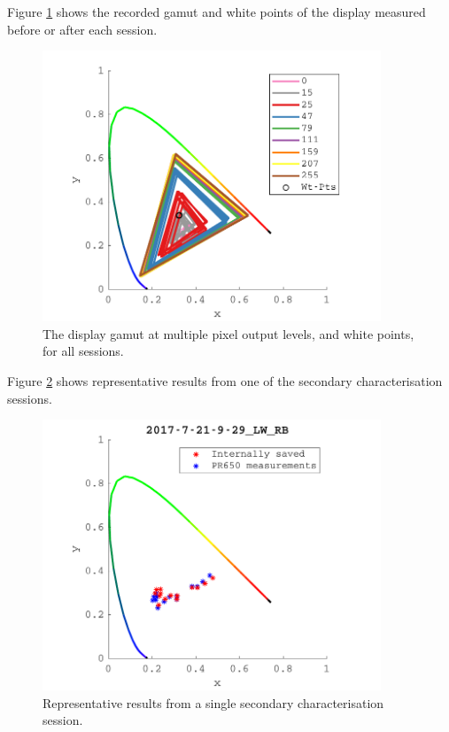 %
Figure \ref{fig:SSgamut} shows the recorded gamut and white points of the display measured before or after each session. 
%
\begin{figure}[htbp]
\includegraphics[max width=0.9\textwidth,center]{figs/SmallSphere/SSgamut.pdf}
\caption{The display gamut at multiple pixel output levels, and white points, for all sessions.}
\label{fig:SSgamut}
\end{figure}
%
Figure \ref{fig:SScal2} shows representative results from one of the secondary characterisation sessions.
%
\begin{figure}[htbp]
\includegraphics[max width=0.9\textwidth,center]{figs/SmallSphere/SSseccal.pdf}
\caption{Representative results from a single secondary characterisation session.}
\label{fig:SScal2}
\end{figure}

